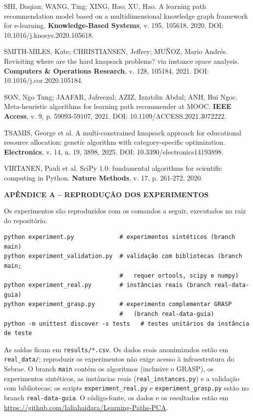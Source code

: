 \documentclass[12pt,a4paper]{article}
\begin{document}
\begin{singlespace}
\noindent SHI, Daqian; WANG, Ting; XING, Hao; XU, Hao. A learning path recommendation model based on a multidimensional knowledge graph framework for e-learning. \textbf{Knowledge-Based Systems}, v. 195, 105618, 2020. DOI: 10.1016/j.knosys.2020.105618.\par\vspace{1em}
\noindent SMITH-MILES, Kate; CHRISTIANSEN, Jeffrey; MUÑOZ, Mario Andrés. Revisiting where are the hard knapsack problems? via instance space analysis. \textbf{Computers \& Operations Research}, v. 128, 105184, 2021. DOI: 10.1016/j.cor.2020.105184.\par\vspace{1em}
\noindent SON, Ngo Tung; JAAFAR, Jafreezal; AZIZ, Izzatdin Abdul; ANH, Bui Ngoc. Meta-heuristic algorithms for learning path recommender at MOOC. \textbf{IEEE Access}, v. 9, p. 59093-59107, 2021. DOI: 10.1109/ACCESS.2021.3072222.\par\vspace{1em}
\noindent TSAMIS, George et al. A multi-constrained knapsack approach for educational resource allocation: genetic algorithm with category-specific optimization. \textbf{Electronics}, v. 14, n. 19, 3898, 2025. DOI: 10.3390/electronics14193898.\par\vspace{1em}
\noindent VIRTANEN, Pauli et al. SciPy 1.0: fundamental algorithms for scientific computing in Python. \textbf{Nature Methods}, v. 17, p. 261-272, 2020.\par\vspace{1em}
\end{singlespace}
\clearpage
\begin{center}{\bfseries APÊNDICE A -- REPRODUÇÃO DOS EXPERIMENTOS}\end{center}\vspace{0.5em}
Os experimentos são reproduzidos com os comandos a seguir, executados na raiz do repositório.

\begin{singlespace}\small
\begin{verbatim}
python experiment.py             # experimentos sintéticos (branch main)
python experiment_validation.py  # validação com bibliotecas (branch main;
                                 #   requer ortools, scipy e numpy)
python experiment_real.py        # instâncias reais (branch real-data-guia)
python experiment_grasp.py       # experimento complementar GRASP
                                 #   (branch real-data-guia)
python -m unittest discover -s tests   # testes unitários da instância de teste
\end{verbatim}
\end{singlespace}
As saídas ficam em \texttt{results/*.csv}. Os dados reais anonimizados estão em \texttt{real\_data/}; reproduzir os experimentos não exige acesso à infraestrutura do Sebrae. O branch \texttt{main} contém os algoritmos (inclusive o GRASP), os experimentos sintéticos, as instâncias reais (\texttt{real\_instances.py}) e a validação com bibliotecas; os scripts \texttt{experiment\_real.py} e \texttt{experiment\_grasp.py} estão no branch \texttt{real-data-guia}. O código-fonte, os dados e os resultados estão em \url{https://github.com/laliahaidara/Learning-Paths-PCA}.
\end{document}
